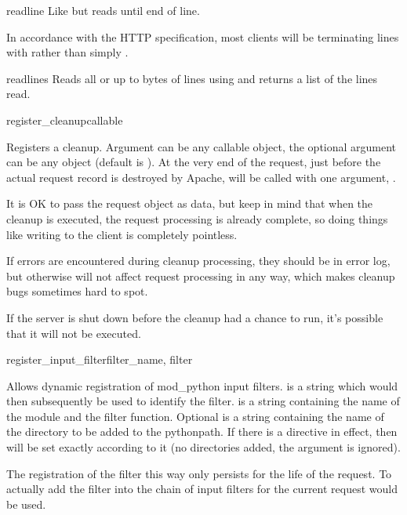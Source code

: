 \begin{methoddesc}[request]{readline}{}
  Like  but reads until end of line. 
  
  \begin{notice}
    In accordance with the HTTP specification, most clients will
    be terminating lines with  rather
    than simply .
  \end{notice}

\end{methoddesc}

\begin{methoddesc}[request]{readlines}{}
  Reads all or up to  bytes of lines using
   and returns a list of the lines read.
\end{methoddesc}

\begin{methoddesc}[request]{register_cleanup}{callable}

  Registers a cleanup. Argument  can be any callable
  object, the optional argument  can be any object (default is
  ). At the very end of the request, just before the actual
  request record is destroyed by Apache,  will be called
  with one argument, .

  It is OK to pass the request object as data, but keep in mind that
  when the cleanup is executed, the request processing is already
  complete, so doing things like writing to the client is completely
  pointless. 

  If errors are encountered during cleanup processing, they should be in
  error log, but otherwise will not affect request processing in any
  way, which makes cleanup bugs sometimes hard to spot.

  If the server is shut down before the cleanup had a chance to run,
  it's possible that it will not be executed.

\end{methoddesc}

\begin{methoddesc}[request]{register_input_filter}{filter_name, filter}

  Allows dynamic registration of mod_python input filters. 
  is a string which would then subsequently be used to identify the filter.
   is a string containing the name of the module and the filter
  function.  Optional  is a string containing the name of the
  directory to be added to the pythonpath. If there is a 
  directive in effect, then  will be set exactly according
  to it (no directories added, the  argument is ignored).

  The registration of the filter this way only persists for the life of the
  request. To actually add the filter into the chain of input filters for
  the current request  would be used.

\end{methoddesc}

